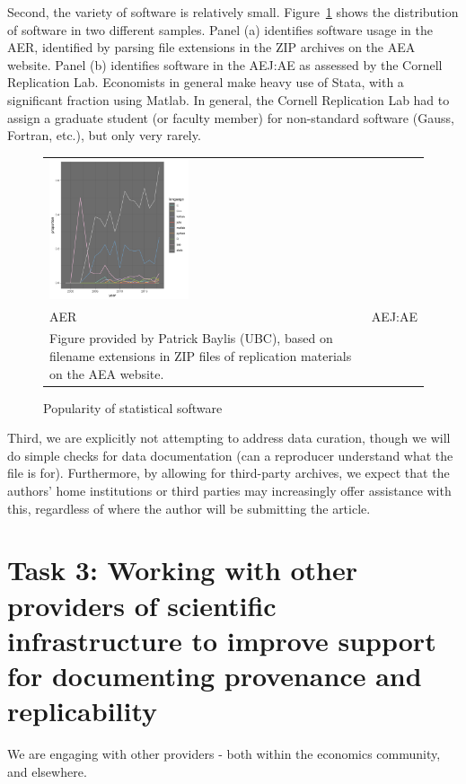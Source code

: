 \documentclass[AEJ]{AEA}
\begin{document}
Second, the variety of software is relatively small. Figure~\ref{fig:aer_programs_by_year} shows the distribution of software in two different samples. Panel (a) identifies software usage in the AER, identified by parsing file extensions in the ZIP archives on the AEA website. Panel (b) identifies software in the AEJ:AE as assessed by the Cornell Replication Lab. Economists in general make heavy use of Stata, with a significant fraction using Matlab. In general, the Cornell Replication Lab had to assign a graduate student (or faculty member) for non-standard software (Gauss, Fortran, etc.), but only very rarely.

\begin{figure}
    \centering
    \begin{tabular}{p{}p{}}
\includegraphics[width=0.45\textwidth]{images/aer_programs_by_year.png}
   
  &
    
   \\
 AER & AEJ:AE \\
      \footnotesize Figure provided by Patrick Baylis (UBC), based on filename extensions in ZIP files of replication materials on the AEA website.\\
\end{tabular}
\caption{Popularity of statistical software\label{fig:aer_programs_by_year}}
\end{figure}

Third, we are explicitly not attempting to address data curation, though we will do simple checks for data documentation (can a reproducer understand what the file is for). Furthermore,  by allowing for third-party archives, we expect that the authors' home institutions or third parties may increasingly offer assistance with this, regardless of where the author will be submitting the article. 


\section{Task 3: Working with other providers of scientific infrastructure to improve support for documenting provenance and replicability}
We are engaging with other providers - both within the economics community, and elsewhere. 
\end{document}

